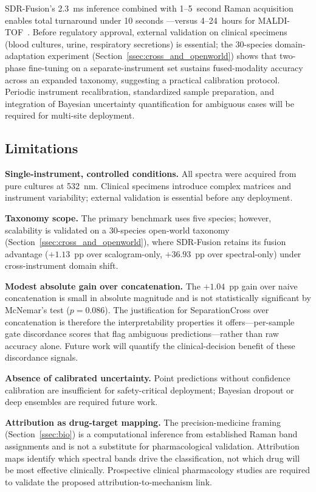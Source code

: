 \documentclass[preprint,12pt]{elsarticle}
\begin{document}
SDR-Fusion's 2.3~ms inference combined with 1--5~second Raman
acquisition enables total turnaround under 10 seconds ---versus
4--24~hours for
MALDI-TOF~\cite{singh2022culture,maruthamuthu2020rapid}. Before
regulatory approval, external validation on clinical specimens (blood
cultures, urine, respiratory secretions) is essential; the
30-species domain-adaptation experiment
(Section~\ref{ssec:cross_and_openworld})
shows that two-phase fine-tuning on a separate-instrument set sustains
fused-modality accuracy across an expanded taxonomy,
suggesting a practical calibration protocol. Periodic instrument
recalibration, standardized sample preparation, and integration of
Bayesian uncertainty quantification for ambiguous cases will be
required for multi-site deployment.

\subsection{Limitations}
\label{ssec:limits}

\textbf{Single-instrument, controlled conditions.} All spectra were
acquired from pure cultures at 532~nm. Clinical specimens introduce
complex matrices and instrument variability; external validation is
essential before any deployment.

\textbf{Taxonomy scope.} The primary benchmark uses five species;
however, scalability is validated on a 30-species open-world taxonomy
(Section~\ref{ssec:cross_and_openworld}), where SDR-Fusion retains its
fusion advantage ($+1.13$~pp over scalogram-only, $+36.93$~pp over
spectral-only) under cross-instrument domain shift.

\textbf{Modest absolute gain over concatenation.} The $+1.04$~pp gain
over naive concatenation is small in absolute magnitude and is not
statistically significant by McNemar's test ($p{=}0.086$). The
justification for SeparationCross over concatenation is therefore the
interpretability properties it offers---per-sample gate discordance
scores that flag ambiguous predictions---rather than raw accuracy
alone. Future work will quantify the clinical-decision benefit of
these discordance signals.

\textbf{Absence of calibrated uncertainty.} Point predictions without
confidence calibration are insufficient for safety-critical
deployment; Bayesian dropout or deep ensembles are required future
work.

\textbf{Attribution as drug-target mapping.} The precision-medicine
framing (Section~\ref{ssec:bio}) is a computational inference from
established Raman band assignments and is not a substitute for
pharmacological validation. Attribution maps identify which spectral
bands drive the classification, not which drug will be most effective
clinically. Prospective clinical pharmacology studies are required to
validate the proposed attribution-to-mechanism link.
\end{document}
